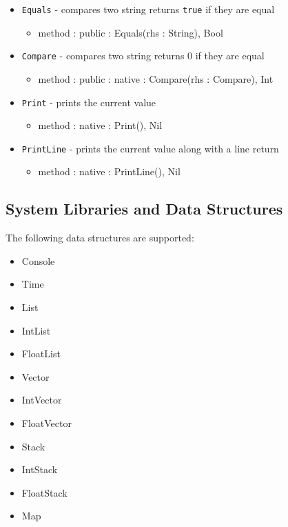 \documentclass[12pt]{article}
\begin{document}
\begin{itemize}
\begin{itemize}
	\end{itemize}
    \item \texttt{Equals} - compares two string returns \texttt{true} if they are equal
    	\begin{itemize}
	\item method : public : Equals(rhs : String), Bool
	\end{itemize}
    \item \texttt{Compare} - compares two string returns 0 if they are equal
    	\begin{itemize}
	\item method : public : native : Compare(rhs : Compare), Int
	\end{itemize}
   \item \texttt{Print} - prints the current value
    	\begin{itemize}
	\item method : native : Print(), Nil
	\end{itemize}
    \item \texttt{PrintLine} - prints the current value along with a line return
    	\begin{itemize}
	\item method : native : PrintLine(), Nil
	\end{itemize}
\end{itemize}

\subsection{System Libraries and Data Structures}
The following data structures are supported:
\begin{itemize}
    \item Console
    \item Time
    \item List
    \item IntList
    \item FloatList
    \item Vector
    \item IntVector
    \item FloatVector
    \item Stack
    \item IntStack
    \item FloatStack
    \item Map
\end{itemize}
\end{document}
